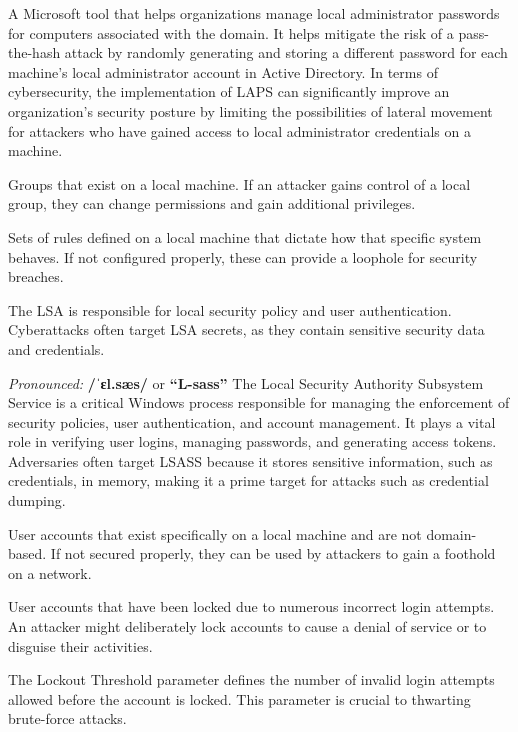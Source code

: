  A Microsoft tool that helps organizations manage local administrator passwords for computers associated with the domain. It helps mitigate the risk of a pass-the-hash attack by randomly generating and storing a different password for each machine’s local administrator account in Active Directory. In terms of cybersecurity, the implementation of LAPS can significantly improve an organization’s security posture by limiting the possibilities of lateral movement for attackers who have gained access to local administrator credentials on a machine.

 Groups that exist on a local machine. If an attacker gains control of a local group, they can change permissions and gain additional privileges.

 Sets of rules defined on a local machine that dictate how that specific system behaves. If not configured properly, these can provide a loophole for security breaches.

 The LSA is responsible for local security policy and user authentication. Cyberattacks often target LSA secrets, as they contain sensitive security data and credentials.

\textit{Pronounced:} \textbf{/ˈɛl.sæs/} or \textbf{“L-sass”}
The Local Security Authority Subsystem Service is a critical Windows process responsible for managing the enforcement of security policies, user authentication, and account management. It plays a vital role in verifying user logins, managing passwords, and generating access tokens. Adversaries often target LSASS because it stores sensitive information, such as credentials, in memory, making it a prime target for attacks such as credential dumping.

 User accounts that exist specifically on a local machine and are not domain-based. If not secured properly, they can be used by attackers to gain a foothold on a network.

 User accounts that have been locked due to numerous incorrect login attempts. An attacker might deliberately lock accounts to cause a denial of service or to disguise their activities.

 The Lockout Threshold parameter defines the number of invalid login attempts allowed before the account is locked. This parameter is crucial to thwarting brute-force attacks.

